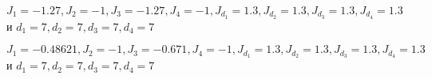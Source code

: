 \begin{figure}[h]
	\begin{minipage}{0.47\linewidth}
	\end{minipage}
	\hfill
	\begin{minipage}{0.47\linewidth}
	\end{minipage}
	\vfill
	\begin{minipage}{0.47\linewidth}
	\end{minipage}
	\hfill
	\begin{minipage}{0.47\linewidth}
	\end{minipage}
	\caption{$J_1 = -1.27, J_2 = -1, J_3 = -1.27, J_4 = -1, J_{d_1} = 1.3, J_{d_2} = 1.3, J_{d_3} = 1.3, J_{d_4} = 1.3$ и $d_1 = 7, d_2 = 7, d_3 = 7, d_4 = 7$}
	\label{3trans}
\end{figure}


 \begin{figure}[h]
	\begin{minipage}{0.47\linewidth}
	\end{minipage}
	\hfill
	\begin{minipage}{0.47\linewidth}
	\end{minipage}
		\vfill
	\begin{minipage}{0.47\linewidth}
	\end{minipage}
	\hfill
	\begin{minipage}{0.47\linewidth}
	\end{minipage}
	\caption{$J_1 = -0.48621, J_2 = -1, J_3 = -0.671, J_4 = -1, J_{d_1} = 1.3, J_{d_2} = 1.3, J_{d_3} = 1.3, J_{d_4} = 1.3$ и $d_1 = 7, d_2 = 7, d_3 = 7, d_4 = 7$}
	\label{5trans}
\end{figure}

